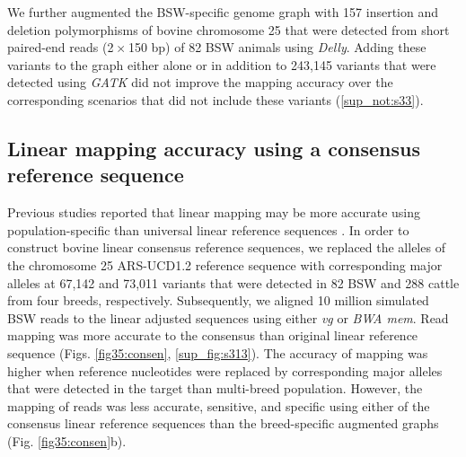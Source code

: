 \documentclass[../main.tex]{subfiles}
\begin{document}
We further augmented the BSW-specific genome graph with 157 insertion and deletion polymorphisms of bovine chromosome 25 that were detected from short paired-end reads (2 $×$ 150 bp) of 82 BSW animals using \emph{Delly}. Adding these variants to the graph either alone or in addition to 243,145 variants that were detected using \emph{GATK} did not improve the mapping accuracy over the corresponding scenarios that did not include these variants (\ref{sup_not:s33}).

\subsection*{Linear mapping accuracy using a consensus reference sequence}

Previous studies reported that linear mapping may be more accurate using population-specific than universal linear reference sequences \citep{ballouz2019time,shukla2019hg19kindel,dewey2011phased}. In order to construct bovine linear consensus reference sequences, we replaced the alleles of the chromosome 25 ARS-UCD1.2 reference sequence with corresponding major alleles at 67,142 and 73,011 variants that were detected in 82 BSW and 288 cattle from four breeds, respectively. Subsequently, we aligned 10 million simulated BSW reads to the linear adjusted sequences using either \emph{vg} or \emph{BWA mem}. Read mapping was more accurate to the consensus than original linear reference sequence (Figs. \ref{fig35:consen}, \ref{sup_fig:s313}). The accuracy of mapping was higher when reference nucleotides were replaced by corresponding major alleles that were detected in the target than multi-breed population. However, the mapping of reads was less accurate, sensitive, and specific using either of the consensus linear reference sequences than the breed-specific augmented graphs (Fig. \ref{fig35:consen}b).
\end{document}
